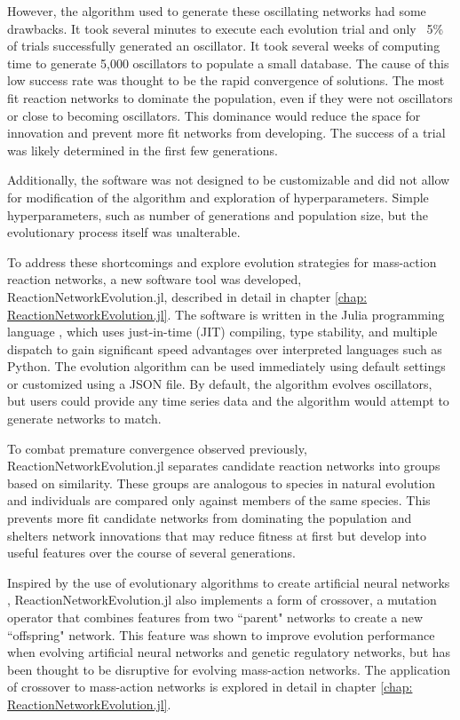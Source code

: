 \documentclass[12pt]{report}
\begin{document}
However, the algorithm used to generate these oscillating networks had some drawbacks. It took several minutes to execute each evolution trial and only ~5\% of trials successfully generated an oscillator.  It took several weeks of computing time to generate 5,000 oscillators to populate a small database. The cause of this low success rate was thought to be the rapid convergence of solutions. The most fit reaction networks to dominate the population, even if they were not oscillators or close to becoming oscillators. This dominance would reduce the space for innovation and prevent more fit networks from developing. The success of a trial was likely determined in the first few generations.

Additionally, the software was not designed to be customizable and did not allow for modification of the algorithm and exploration of hyperparameters. Simple hyperparameters, such as number of generations and population size, but the evolutionary process itself was unalterable.

To address these shortcomings and explore evolution strategies for mass-action reaction networks, a new software tool was developed, ReactionNetworkEvolution.jl, described in detail in chapter \ref{chap: ReactionNetworkEvolution.jl}. The software is written in the Julia programming language \cite{bezanson2017julia}, which uses just-in-time (JIT) compiling, type stability, and multiple dispatch to gain significant speed advantages over interpreted languages such as Python. The evolution algorithm can be used immediately using default settings or customized using a JSON file. By default, the algorithm evolves oscillators, but users could provide any time series data and the algorithm would attempt to generate networks to match. 

To combat premature convergence observed previously, ReactionNetworkEvolution.jl separates candidate reaction networks into groups based on similarity. These groups are analogous to species in natural evolution and individuals are compared only against members of the same species. This prevents more fit candidate networks from dominating the population and shelters network innovations that may reduce fitness at first but develop into useful features over the course of several generations. 

Inspired by the use of evolutionary algorithms to create artificial neural networks \cite{stanley_evolving_2002}, ReactionNetworkEvolution.jl also implements a form of crossover, a mutation operator that combines features from two ``parent" networks to create a new ``offspring" network. This feature was shown to improve evolution performance when evolving artificial neural networks and genetic regulatory networks, but has been thought to be disruptive for evolving mass-action networks. The application of crossover to mass-action networks is explored in detail in chapter \ref{chap: ReactionNetworkEvolution.jl}.
\end{document}
